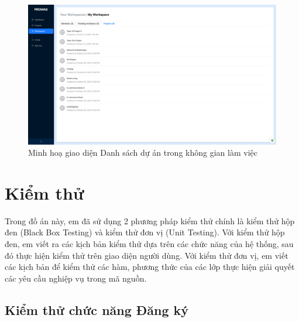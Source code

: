 \documentclass[../DoAn.tex]{subfiles}
\begin{document}
\begin{figure}[H]
    \centering
    \includegraphics[width=1.0\linewidth]{Hinhve/Screenshot_WorkspaceDetail_Projects.png}
    \caption{Minh hoạ giao diện Danh sách dự án trong không gian làm việc}
    \label{fig:Screenshot_WorkspaceDetail_Projects}
\end{figure}

\newpage

\section{Kiểm thử}
\label{section:4.4}

Trong đồ án này, em đã sử dụng 2 phương pháp kiểm thử chính là kiểm thử hộp đen (Black Box Testing) và kiểm thử đơn vị (Unit Testing). Với kiểm thử hộp đen,
em viết ra các kịch bản kiểm thử dựa trên các chức năng của hệ thống, sau đó thực hiện kiểm thử trên giao diện người dùng. Với kiểm thử đơn vị, em viết các
kịch bản để kiểm thử các hàm, phương thức của các lớp thực hiện giải quyết các yêu cầu nghiệp vụ trong mã nguồn.

\subsection{Kiểm thử chức năng Đăng ký}
\label{subsection:4.4.1}
\end{document}
